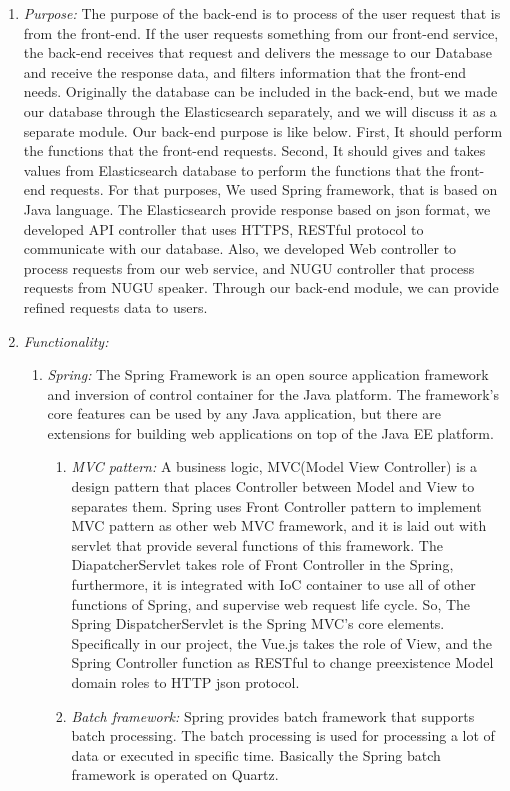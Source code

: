 \documentclass[conference]{IEEEtran}
\begin{document}
\begin{enumerate}
  \item \textit{Purpose: } The purpose of the back-end is to process of the user request that is from the front-end. If the user requests something from our front-end service, the back-end receives that request and delivers the message to our Database and receive the response data, and filters information that the front-end needs. Originally the database can be included in the back-end, but we made our database through the Elasticsearch separately, and we will discuss it as a separate module.
Our back-end purpose is like below. First, It should perform the functions that the front-end requests. Second, It should gives and takes values from Elasticsearch database to perform the functions that the front-end requests.
For that purposes, We used Spring framework, that is based on Java language. The Elasticsearch provide response based on json format, we developed API controller that uses HTTPS, RESTful protocol to communicate with our database. Also, we developed Web controller to process requests from our web service, and NUGU controller that process requests from NUGU speaker. Through our back-end module, we can provide refined requests data to users.\\
  \item \textit{Functionality: }
  \begin{enumerate}

\item \textit {Spring: }   The Spring Framework is an open source application framework and inversion of control container for the Java platform. The framework's core features can be used by any Java application, but there are extensions for building web applications on top of the Java EE platform.
\begin{enumerate}
\item \textit {MVC pattern:} A business logic, MVC(Model View Controller) is a design pattern that places Controller between Model and View to separates them. Spring uses Front Controller pattern to implement MVC pattern as other web MVC framework, and it is laid out with servlet that provide several functions of this framework. The DiapatcherServlet takes role of Front Controller in the Spring, furthermore, it is integrated with IoC container to use all of other functions of Spring, and supervise web request life cycle. So, The Spring DispatcherServlet is the Spring MVC’s core elements. Specifically in our project, the Vue.js takes the role of View, and the Spring Controller function as RESTful to change preexistence Model domain roles to HTTP json protocol.
\item \textit {Batch framework:} Spring provides batch framework that supports batch processing. The batch processing is used for processing a lot of data or executed in specific time. Basically the Spring batch framework is operated on Quartz.
 \end{enumerate}
 

\end{enumerate}
\end{enumerate}
\end{document}
